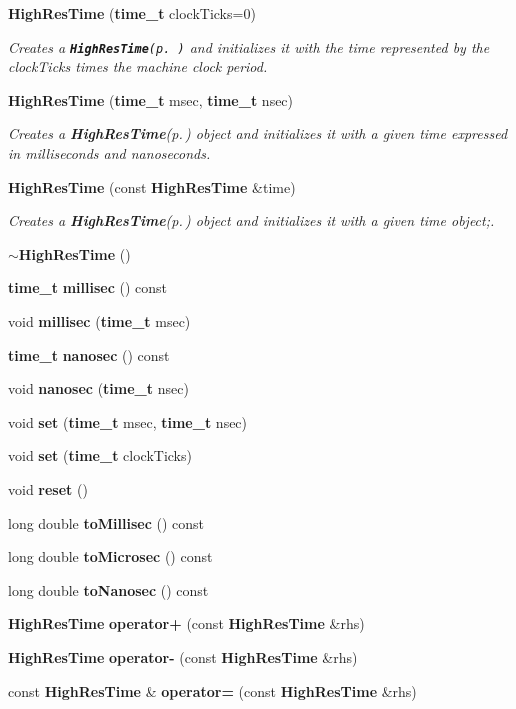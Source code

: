 \begin{CompactItemize}
\item 
{\bf High\-Res\-Time} ({\bf time\_\-t} clock\-Ticks=0)
\begin{CompactList}\small\item\em Creates a {\tt {\bf High\-Res\-Time}{\rm (p.\,\pageref{classctools_1_1time_1_1HighResTime})}} and initializes it with the time represented by the clock\-Ticks times the machine clock period. \item\end{CompactList}\item 
{\bf High\-Res\-Time} ({\bf time\_\-t} msec, {\bf time\_\-t} nsec)
\begin{CompactList}\small\item\em Creates a {\bf High\-Res\-Time}{\rm (p.\,\pageref{classctools_1_1time_1_1HighResTime})} object and initializes it with a given time expressed in milliseconds and nanoseconds. \item\end{CompactList}\item 
{\bf High\-Res\-Time} (const {\bf High\-Res\-Time} \&time)
\begin{CompactList}\small\item\em Creates a {\bf High\-Res\-Time}{\rm (p.\,\pageref{classctools_1_1time_1_1HighResTime})} object and initializes it with a given time object;. \item\end{CompactList}\item 
{\bf $\sim$High\-Res\-Time} ()
\item 
{\bf time\_\-t} {\bf millisec} () const 
\item 
void {\bf millisec} ({\bf time\_\-t} msec)
\item 
{\bf time\_\-t} {\bf nanosec} () const 
\item 
void {\bf nanosec} ({\bf time\_\-t} nsec)
\item 
void {\bf set} ({\bf time\_\-t} msec, {\bf time\_\-t} nsec)
\item 
void {\bf set} ({\bf time\_\-t} clock\-Ticks)
\item 
void {\bf reset} ()
\item 
long double {\bf to\-Millisec} () const 
\item 
long double {\bf to\-Microsec} () const 
\item 
long double {\bf to\-Nanosec} () const 
\item 
{\bf High\-Res\-Time} {\bf operator+} (const {\bf High\-Res\-Time} \&rhs)
\item 
{\bf High\-Res\-Time} {\bf operator-} (const {\bf High\-Res\-Time} \&rhs)
\item 
const {\bf High\-Res\-Time} \& {\bf operator=} (const {\bf High\-Res\-Time} \&rhs)
\end{CompactItemize}


